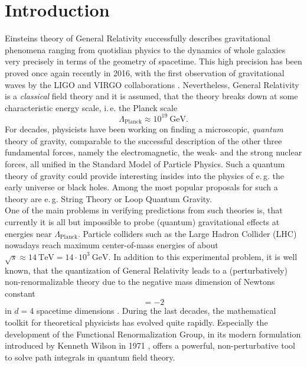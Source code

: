 \chapter{Introduction}
Einsteins theory of General Relativity successfully describes gravitational phenomena ranging from quotidian physics to the dynamics of whole galaxies very precisely in terms of the geometry of spacetime. This high precision has been proved once again recently in 2016, with the first observation of gravitational waves by the LIGO and VIRGO collaborations \cite{LIGO2016}. Nevertheless, General Relativity is a \textit{classical} field theory and it is assumed, that the theory breaks down at some characteristic energy scale, i.\,e. the Planck scale
\begin{equation*}
	\Lambda_{\text{Planck}} \approx 10^{19} \ \text{GeV}. 
\end{equation*}
For decades, physicists have been working on finding a microscopic,  \textit{quantum} theory of gravity, comparable to the successful description of the other three fundamental forces, namely the electromagnetic, the weak- and the strong nuclear forces, all unified in the Standard Model of Particle Physics. Such a quantum theory of gravity could provide interesting insides into the physics of e.\,g. the early universe or black holes. Among the most popular proposals for such a theory are e.\,g. String Theory or Loop Quantum Gravity. \\
 One of the main problems in verifying predictions from such theories is, that currently it is all but impossible to probe (quantum) gravitational effects at energies near $\Lambda_{\text{Planck}}$. Particle colliders such as the Large Hadron Collider (LHC) nowadays reach maximum center-of-mass energies of about $\sqrt{s} \approx 14 \ \text{TeV} = 14\cdot 10^3 \ \text{GeV}$. In addition to this experimental problem, it is well known, that the quantization of General Relativity leads to a (perturbatively) non-renormalizable theory  due to the negative mass dimension of Newtons constant
\begin{equation*}
	[G] = -2  
\end{equation*}
in $d=4$ spacetime dimensions \cite{GoroffSanotti1985, tHooftVeltmann1974}. During the last decades, the mathematical toolkit for theoretical physicists has evolved quite rapidly. Especially the development of the Functional Renormalization Group, in its modern formulation introduced by Kenneth Wilson in 1971 \cite{Wilson1971}, offers a powerful, non-perturbative tool to solve path integrals in quantum field theory. \\
